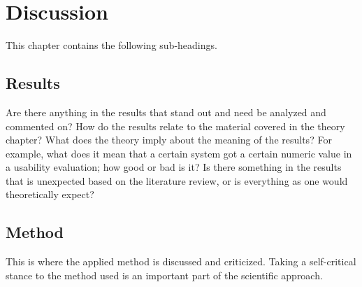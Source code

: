 \chapter{Discussion}
\label{cha:discussion}

%
%









This chapter contains the following sub-headings.

\section{Results}
\label{sec:discussion-results}

Are there anything in the results that stand out and need be
analyzed and commented on? How do the results relate to the
material covered in the theory chapter? What does the theory
imply about the meaning of the results? For example, what
does it mean that a certain system got a certain numeric value
in a usability evaluation; how good or bad is it? Is there
something in the results that is unexpected based on the
literature review, or is everything as one would theoretically
expect?

\section{Method}
\label{sec:discussion-method}

This is where the applied method is discussed and criticized.
Taking a self-critical stance to the method used is an
important part of the scientific approach.

